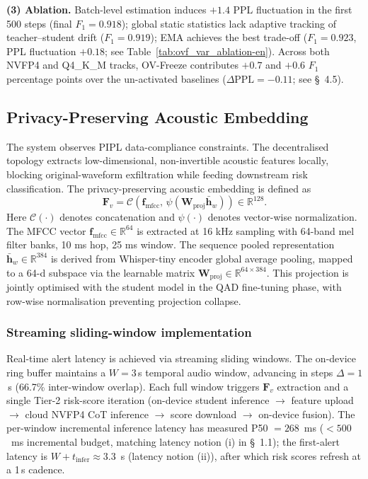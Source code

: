 \documentclass[11pt, a4paper]{article}
\begin{document}
\textbf{(3) Ablation.} Batch-level estimation induces $+1.4$ PPL fluctuation in the first 500 steps (final $F_1 = 0.918$); global static statistics lack adaptive tracking of teacher--student drift ($F_1 = 0.919$); EMA achieves the best trade-off ($F_1 = 0.923$, PPL fluctuation $+0.18$; see Table~\ref{tab:ovf_var_ablation-en}). Across both NVFP4 and Q4\_K\_M tracks, OV-Freeze contributes $+0.7$ and $+0.6$ $F_1$ percentage points over the un-activated baselines ($\Delta\text{PPL}=-0.11$; see \S~4.5).

\subsection{Privacy-Preserving Acoustic Embedding}

The system observes PIPL data-compliance constraints. The decentralised topology extracts low-dimensional, non-invertible acoustic features locally, blocking original-waveform exfiltration while feeding downstream risk classification. The privacy-preserving acoustic embedding is defined as
\begin{equation}
\bm{F}_v = \mathcal{C}\!\left(\bm{f}_{\mathrm{mfcc}},\,\psi(\bm{W}_{\mathrm{proj}}\bar{\bm{h}}_w)\right)\in\mathbb{R}^{128}.
\end{equation}
Here $\mathcal{C}(\cdot)$ denotes concatenation and $\psi(\cdot)$ denotes vector-wise normalization. The MFCC vector $\bm{f}_{\mathrm{mfcc}}\in\mathbb{R}^{64}$ is extracted at 16 kHz sampling with 64-band mel filter banks, 10 ms hop, 25 ms window. The sequence pooled representation $\bar{\bm{h}}_w\in\mathbb{R}^{384}$ is derived from Whisper-tiny encoder global average pooling, mapped to a 64-d subspace via the learnable matrix $\bm{W}_{\mathrm{proj}}\in\mathbb{R}^{64\times 384}$. This projection is jointly optimised with the student model in the QAD fine-tuning phase, with row-wise normalisation preventing projection collapse.

\subsubsection{Streaming sliding-window implementation}

Real-time alert latency is achieved via streaming sliding windows. The on-device ring buffer maintains a $W = 3$\,s temporal audio window, advancing in steps $\Delta = 1$\,s (66.7\% inter-window overlap). Each full window triggers $\bm{F}_v$ extraction and a single Tier-2 risk-score iteration (on-device student inference $\rightarrow$ feature upload $\rightarrow$ cloud NVFP4 CoT inference $\rightarrow$ score download $\rightarrow$ on-device fusion). The per-window incremental inference latency has measured P50 $=268$~ms ($<500$~ms incremental budget, matching latency notion (i) in \S~1.1); the first-alert latency is $W + t_{\mathrm{infer}}\approx 3.3$~s (latency notion (ii)), after which risk scores refresh at a 1\,s cadence.
\end{document}
